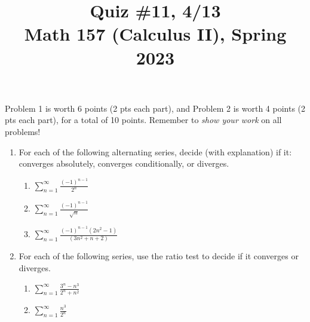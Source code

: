 \documentclass[11pt]{article}
\title{Quiz \#11, 4/13\\ Math 157 (Calculus II), Spring 2023}
\date{}
\begin{document}
\maketitle

\thispagestyle{empty}

\vspace{-2cm}

Problem 1 is worth 6 points (2 pts each part), and Problem 2 is worth 4 points (2 pts each part), for a total of 10 points. Remember to \emph{show your work} on all problems!

\begin{enumerate}

\item For each of the following alternating series, decide (with explanation) if it: converges absolutely, converges conditionally, or diverges.

\begin{enumerate}
\item $\displaystyle \sum_{n=1}^{\infty} \frac{(-1)^{n-1}}{2^n}$
\item $\displaystyle \sum_{n=1}^{\infty} \frac{(-1)^{n-1}}{\sqrt{n}}$
\item $\displaystyle \sum_{n=1}^{\infty} \frac{(-1)^{n-1} (2n^2-1)}{(3n^2+n+2)} $
\end{enumerate}

\vspace{2.1in}

\item For each of the following series, use the ratio test to decide if it converges or diverges.
\begin{enumerate}
\item $\displaystyle \sum_{n=1}^{\infty} \frac{3^n-n^3}{2^n+n^2}$
\item $\displaystyle \sum_{n=1}^{\infty} \frac{n^3}{2^n}$
\end{enumerate}

\end{enumerate}
\end{document}

